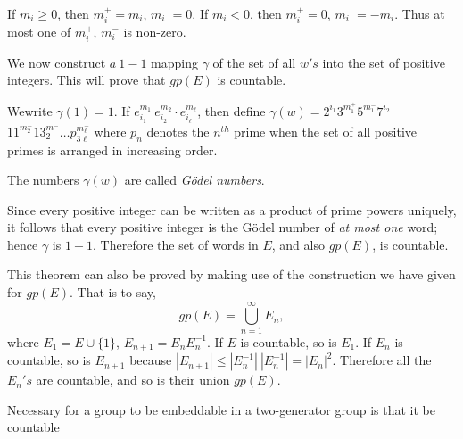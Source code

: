 If $m_i \geq 0$, then $m^+_i = m_i$, $m^{-}_i = 0$. If $m_i < 0$, then
$m^+ _i = 0$, $m^{-}_i = -m_i$. Thus at most one of $m^+_i$, $m^-_i$
is non-zero. 

We now construct $a ~ 1-1$ mapping $\gamma$ of the set of all $w' s$
into the set of positive integers. This will prove that $g p(E)$ is
countable. 

We\pageoriginale write $\gamma (1) = 1$. If $e^{m_1}_{i_1} ~ e^{m_2}_{i_2} \cdot
e^{m_\ell}_{i_\ell}$, then define $\gamma (w) = 2^{i_1} 3^{m^+_1}
5^{m^-_1} 7^{i_2}$ $11^{m^{-}_2} 13^{m^-}_2 \ldots p^{m^-_\ell}_{3\ell}$
where $p_n$ denotes the $n^{th}$ prime when the set of all positive
primes is arranged in increasing order. 

The numbers $\gamma (w)$ are called \textit{G\"{o}del numbers}. 

Since every positive integer can be written as a product of prime
powers uniquely, it follows that every positive integer is the
G\"{o}del number of \textit{at most one} word; hence $\gamma$ is
$1-1$. Therefore the set of words in $E$, and also $gp(E)$, is
countable. 

\begin{remark*}
  This theorem can also be proved by making use of the construction we
  have given for $gp(E)$. That is to say, 
  $$
  gp(E) = \bigcup_{n=1}^\infty E_n,
  $$
  where $E_1 = E \cup \{ 1 \}$, $E_{n+1} = E_n E_{n}^{-1}$. If $E$ is
  countable, so is $E_1$. If $E_n$ is countable, so is $E_{n+1}$
  because $| E_{n+1}| \leq | E_n^{-1} | ~ | E_n^{-1}| = | E_n
  |^2$. Therefore all the $E_n's$ are countable, and so is their union
  $gp(E)$. 
\end{remark*}

\begin{coro*}
  Necessary for a group to be embeddable in a two-generator group is
  that it be countable 
\end{coro*}

\section{}\label{chap2:sec5}%

